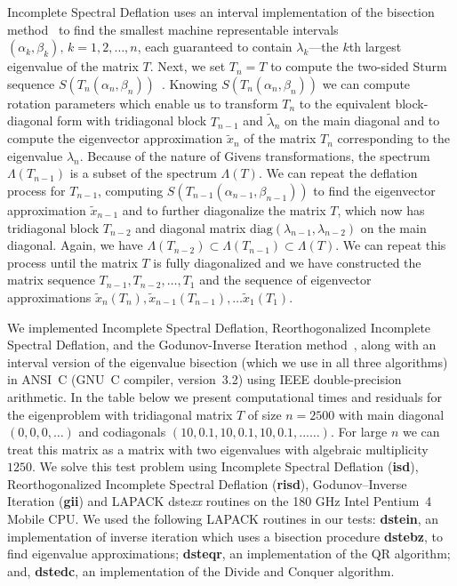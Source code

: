 \documentclass{report}
\begin{document}
Incomplete Spectral Deflation uses an interval implementation of
the bisection method~\cite{garant:eng, matsekh_imacs} to find the
smallest machine representable intervals $(\alpha_k,
\beta_k),\,k=1, 2, \ldots, n$, each guaranteed to contain
$\lambda_k$---the $k$th largest eigenvalue of the matrix $T$.
Next, we set $T_n= T$ to compute the two-sided Sturm sequence
$S(T_n(\alpha_n, \beta_n))$~\cite{garant:eng, matsekh_imacs}.
Knowing $S(T_n(\alpha_n, \beta_n))$ we can compute rotation
parameters which enable us to transform $T_n$ to the equivalent
block-diagonal form with tridiagonal block $T_{n-1}$ and
$\tilde{\lambda}_n$ on the main diagonal and to compute the
eigenvector approximation $\tilde{x}_n$ of the matrix $T_n$
corresponding to the eigenvalue $\lambda_n$. Because of the
nature of Givens transformations, the spectrum $\Lambda(T_{n-1})$
is a subset of the spectrum $\Lambda(T)$. We can repeat the
deflation process for $T_{n-1}$, computing
$S(T_{n-1}(\alpha_{n-1}, \beta_{n-1}))$ to find the eigenvector
approximation $\tilde{x}_{n-1}$ and to further diagonalize the
matrix $T$, which now has tridiagonal block $T_{n-2}$ and
diagonal matrix $\mathrm{diag}(\lambda_{n-1}, \lambda_{n-2})$ on
the main diagonal. Again, we have $\Lambda(T_{n-2}) \subset
\Lambda(T_{n-1}) \subset \Lambda(T)$. We can repeat this process
until the matrix $T$ is fully diagonalized and we have
constructed the matrix sequence $T_{n-1}, T_{n-2}, \ldots, T_{1}$
and the sequence of eigenvector approximations $\tilde{x}_n(T_n),
\tilde{x}_{n-1}(T_{n-1}), \ldots \tilde{x}_1(T_1)$.

We implemented Incomplete Spectral Deflation, Reorthogonalized
Incomplete Spectral Deflation, and the Godunov-Inverse Iteration
method~\cite{matsekh_imacs}, along with an interval version of
the eigenvalue bisection (which we use in all three algorithms)
in ANSI~C (GNU~C compiler, version~3.2) using IEEE
double-precision arithmetic. In the table below we present
computational times and residuals for the eigenproblem with
tridiagonal matrix $T$ of size $n=2500$ with main diagonal $(0,
0, 0, \ldots)$ and codiagonals $(10, 0.1, 10, 0.1, 10, 0.1,
...\ldots)$. For large $n$ we can treat this matrix as a matrix
with two eigenvalues with algebraic multiplicity $1250$. We
solve this test problem using Incomplete Spectral Deflation
(\textbf{isd}), Reorthogonalized Incomplete Spectral Deflation
(\textbf{risd}), Godunov--Inverse Iteration (\textbf{gii}) and
LAPACK dste\emph{xx} routines on the 180 GHz
Intel\textregistered{} Pentium~4 Mobile\textregistered{} CPU\@.
We used the following LAPACK routines in our tests:
\textbf{dstein}, an implementation of inverse iteration which
uses a bisection procedure \textbf{dstebz}, to find eigenvalue
approximations; \textbf{dsteqr}, an implementation of the QR
algorithm; and, \textbf{dstedc}, an implementation of the Divide
and Conquer algorithm.
\end{document}
